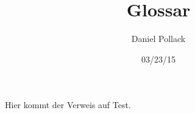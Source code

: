 \documentclass[a4paper,10pt]{article}
\author{Daniel Pollack}
\title{Glossar}
\date{03/23/15}
\begin{document}
Hier kommt der Verweis auf \gls{Test}.
\printglossaries
\end{document}
